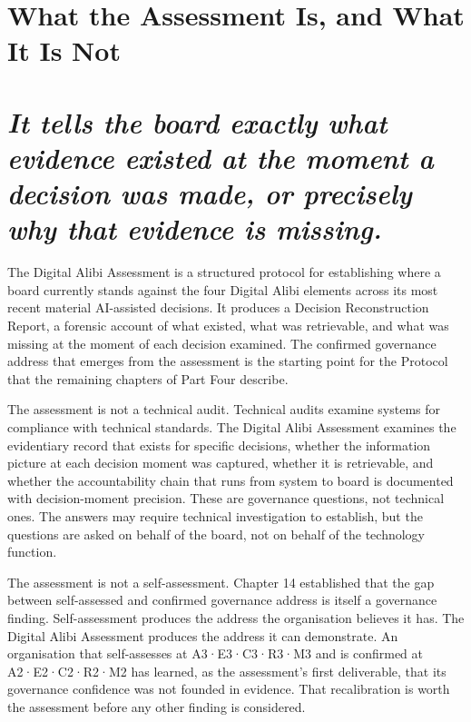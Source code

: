 \scenebreak

\section{What the Assessment Is, and What It Is Not}

\section{\texorpdfstring{\emph{It tells the board exactly what evidence existed at the moment a decision was made, or precisely why that evidence is missing.}}{It tells the board exactly what evidence existed at the moment a decision was made, or precisely why that evidence is missing.}}

The Digital Alibi Assessment is a structured protocol for establishing where a board currently stands against the four Digital Alibi elements across its most recent material AI-assisted decisions. It produces a Decision Reconstruction Report, a forensic account of what existed, what was retrievable, and what was missing at the moment of each decision examined. The confirmed governance address that emerges from the assessment is the starting point for the Protocol that the remaining chapters of Part Four describe.

The assessment is not a technical audit. Technical audits examine systems for compliance with technical standards. The Digital Alibi Assessment examines the evidentiary record that exists for specific decisions, whether the information picture at each decision moment was captured, whether it is retrievable, and whether the accountability chain that runs from system to board is documented with decision-moment precision. These are governance questions, not technical ones. The answers may require technical investigation to establish, but the questions are asked on behalf of the board, not on behalf of the technology function.

The assessment is not a self-assessment. Chapter 14 established that the gap between self-assessed and confirmed governance address is itself a governance finding. Self-assessment produces the address the organisation believes it has. The Digital Alibi Assessment produces the address it can demonstrate. An organisation that self-assesses at A3·E3·C3·R3·M3 and is confirmed at A2·E2·C2·R2·M2 has learned, as the assessment's first deliverable, that its governance confidence was not founded in evidence. That recalibration is worth the assessment before any other finding is considered.

